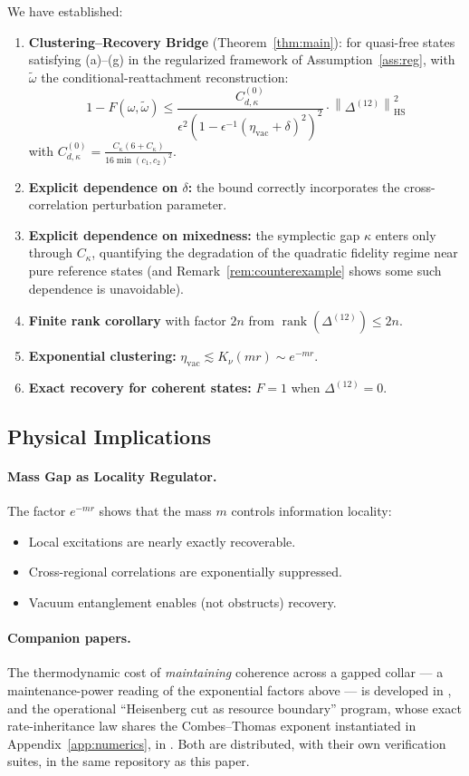 \documentclass[11pt,a4paper]{article}
\theoremstyle{plain}
\theoremstyle{definition}
\theoremstyle{remark}
\newcommand{\hsnorm}[1]{\left\lVert #1 \right\rVert_{\mathrm{HS}}}
\newcommand{\rank}{\operatorname{rank}}
\newcommand{\etavac}{\eta_{\mathrm{vac}}}
\newcommand{\Ckappa}{C_{\kappa}}
\newcommand{\Cd}{C^{(0)}_{d,\kappa}}
\begin{document}
We have established:
\begin{enumerate}
\item \textbf{Clustering--Recovery Bridge} (Theorem~\ref{thm:main}): for quasi-free
states satisfying (a)--(g) in the regularized framework of
Assumption~\ref{ass:reg}, with $\tilde{\omega}$ the conditional-reattachment
reconstruction:
\begin{equation}
1 - F(\omega, \tilde{\omega}) \le
\frac{\Cd}{\epsilon^2\left(1 - \epsilon^{-1}(\etavac + \delta)^2\right)^2}
\cdot \hsnorm{\Delta^{(12)}}^2
\end{equation}
with $\Cd = \frac{\Ckappa(6+\Ckappa)}{16\min(c_1,c_2)^2}$.
\item \textbf{Explicit dependence on $\delta$:} the bound correctly incorporates
the cross-correlation perturbation parameter.
\item \textbf{Explicit dependence on mixedness:} the symplectic gap $\kappa$ enters
only through $\Ckappa$, quantifying the degradation of the quadratic fidelity
regime near pure reference states (and Remark~\ref{rem:counterexample} shows some
such dependence is unavoidable).
\item \textbf{Finite rank corollary} with factor $2n$ from
$\rank(\Delta^{(12)}) \le 2n$.
\item \textbf{Exponential clustering:} $\etavac \lesssim K_\nu(mr) \sim e^{-mr}$.
\item \textbf{Exact recovery for coherent states:} $F = 1$ when
$\Delta^{(12)} = 0$.
\end{enumerate}

\subsection{Physical Implications}

\paragraph{Mass Gap as Locality Regulator.} The factor $e^{-mr}$ shows that the
mass $m$ controls information locality:
\begin{itemize}
\item Local excitations are nearly exactly recoverable.
\item Cross-regional correlations are exponentially suppressed.
\item Vacuum entanglement enables (not obstructs) recovery.
\end{itemize}

\paragraph{Companion papers.} The thermodynamic cost of \emph{maintaining}
coherence across a gapped collar --- a maintenance-power reading of the
exponential factors above --- is developed in \cite{MaintWork}, and the
operational ``Heisenberg cut as resource boundary'' program, whose exact
rate-inheritance law shares the Combes--Thomas exponent instantiated in
Appendix~\ref{app:numerics}, in \cite{HCut}. Both are distributed, with their
own verification suites, in the same repository as this paper.
\end{document}
